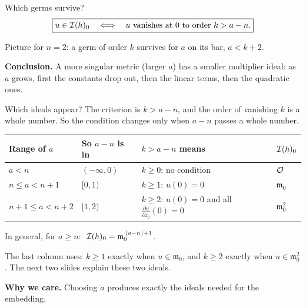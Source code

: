 \begin{frame}{Which germs survive?}
\[
\boxed{u\in\mathcal I(h)_0\quad\Longleftrightarrow\quad u \text{ vanishes at } 0 \text{ to order } k>a-n .}
\]
\begin{center}
\end{center}
Picture for \(n=2\): a germ of order \(k\) survives for \(a\) on its bar, \(a<k+2\).
\par\medskip
\textbf{Conclusion.} A more singular metric (larger \(a\)) has a smaller multiplier ideal: as \(a\) grows, first the constants drop out, then the linear terms, then the quadratic ones.
\end{frame}

\begin{frame}{Which ideals appear?}
\label{fr:which-ideals}
The criterion is \(k>a-n\), and the order of vanishing \(k\) is a whole number. So the condition changes only when \(a-n\) passes a whole number.
\begin{center}
\renewcommand{\arraystretch}{1.4}
\begin{tabular}{llll}
Range of \(a\) & So \(a-n\) is in & \(k>a-n\) means & \(\mathcal I(h)_0\)\\
\hline
\(a<n\) & \((-\infty,0)\) & \(k\ge0\): no condition & \(\mathcal O\)\\
\(n\le a<n+1\) & \([0,1)\) & \(k\ge1\): \(u(0)=0\) & \(\mathfrak m_0\)\\
\(n+1\le a<n+2\) & \([1,2)\) & \(k\ge2\): \(u(0)=0\) and all \(\frac{\partial u}{\partial z_j}(0)=0\) & \(\mathfrak m_0^2\)
\end{tabular}
\end{center}
In general, for \(a\ge n\): \(\ \mathcal I(h)_0=\mathfrak m_0^{\,\lfloor a-n\rfloor+1}\).
\par\medskip
The last column uses: \(k\ge1\) exactly when \(u\in\mathfrak m_0\), and \(k\ge2\) exactly when \(u\in\mathfrak m_0^2\). The next two slides explain these two ideals.
\par\medskip
\textbf{Why we care.} Choosing \(a\) produces exactly the ideals needed for the embedding.
\end{frame}


